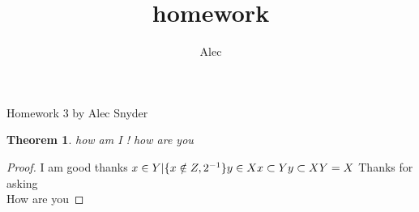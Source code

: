 \documentclass[12pt]{article}
\author{Alec}
\title{homework}
\begin{document}
\begin{center}
Homework 3 by Alec Snyder
\end{center}
\newtheorem{theorem}{Theorem}[section]
\begin{theorem} 
how am I !
how are you
\end{theorem}
\begin{proof}
I am good thanks 
$
x\in Y | \{x \notin Z, 2^{-1}\}
y\in X
x\subset Y
y\subset X \\
Y=X
$
Thanks for asking \\
How are you
\end{proof}
\end{document}

